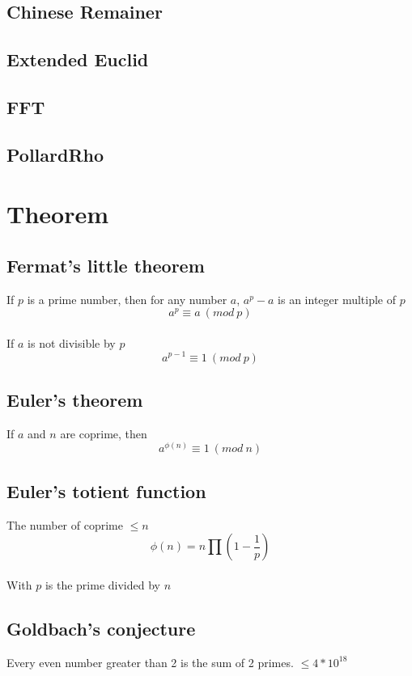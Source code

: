 \documentclass[A4 paper, 12pt, oneside, landscape]{article}
\begin{document}
\begin{multicols}{2}
	\subsection{Chinese Remainer}
	
	
	\subsection{Extended Euclid}
	

	\subsection{FFT}
	

	\subsection{PollardRho}
	

\section{Theorem}
	\subsection{Fermat's little theorem}
	If $p$ is a prime number, then for any number $a$, \(a^p - a\) is an integer multiple of $p$ \\
	\[a ^ p \equiv a \ (mod \ p)\]  \\
	If $a$ is not divisible by $p$ \\
	\[a ^ {p - 1} \equiv 1 \ (mod \ p)\] 
	
	\subsection{Euler's theorem}
	If $a$ and $n$ are coprime, then 
	\[a ^ {\phi(n)} \equiv 1 \ (mod \ n) \]
	
	\subsection{Euler's totient function}
	The number of coprime $\leq n$ \\
	\[\phi(n) = n \prod (1 - \frac{1}{p}) \] \\
	With $p$ is the prime divided by $n$
	
	\subsection{Goldbach's conjecture}
	Every even number greater than 2 is the sum of 2 primes. \(\leq 4 * 10^{18}\)
	

\end{multicols}
\end{document}
